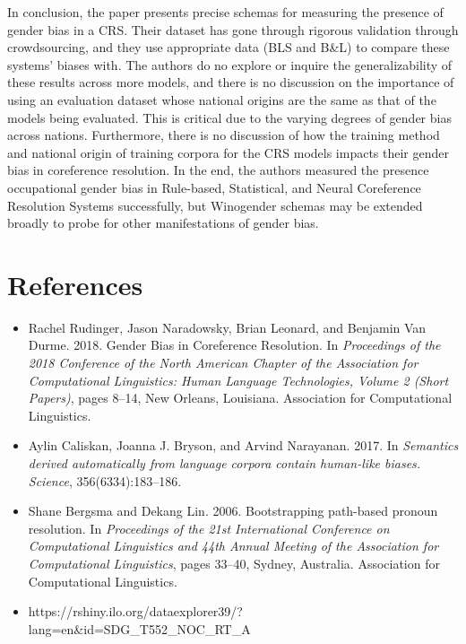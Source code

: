 \documentclass[11pt]{article}
\begin{document}
In conclusion, the paper presents precise schemas for measuring the presence of gender bias in a CRS. Their dataset
has gone through rigorous validation through crowdsourcing, and they use appropriate data (BLS and B\&L) 
to compare these systems' biases with. The authors do no explore or inquire the generalizability of these results across more models, and there is no discussion 
on the importance of using an evaluation dataset whose national origins are the same as that of the models being evaluated. 
This is critical due to the varying degrees of gender bias across nations. Furthermore, there is no discussion of how the training method and national origin 
of training corpora for the CRS models impacts their gender bias in coreference resolution. In the end, the authors 
measured the presence occupational gender bias in Rule-based, Statistical, and Neural Coreference Resolution Systems successfully, but Winogender schemas
may be extended broadly to probe for other manifestations of gender bias.


\section*{References} 
\begin{itemize}
    \item Rachel Rudinger, Jason Naradowsky, Brian Leonard, and Benjamin Van Durme. 2018. Gender Bias in Coreference Resolution. In \textit{Proceedings of the 2018 Conference of the North American Chapter of the Association for Computational Linguistics: Human Language Technologies, Volume 2 (Short Papers)}, pages 8–14, New Orleans, Louisiana. Association for Computational Linguistics.
    \item Aylin Caliskan, Joanna J. Bryson, and Arvind Narayanan. 2017. In \textit{Semantics derived automatically from language corpora contain human-like biases. Science}, 356(6334):183–186.
    \item Shane Bergsma and Dekang Lin. 2006. Bootstrapping
    path-based pronoun resolution. In \textit{Proceedings of the 21st International Conference on Computational Linguistics and 44th Annual Meeting of the Association for Computational Linguistics}, pages 33–40, Sydney, Australia. Association for Computational Linguistics.
    \item https://rshiny.ilo.org/dataexplorer39/?lang=en\&id=SDG\_T552\_NOC\_RT\_A
\end{itemize}
\end{document}
